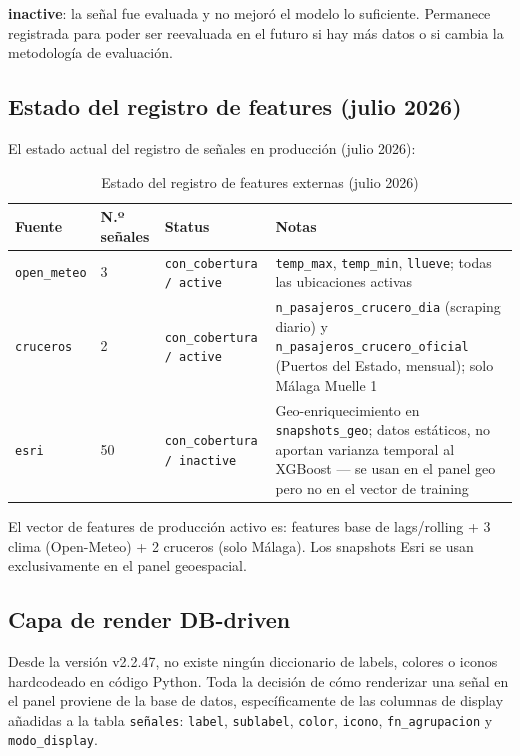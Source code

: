 \documentclass[12pt, a4paper]{article}
\begin{document}
\textbf{inactive}: la señal fue evaluada y no mejoró el modelo lo suficiente. Permanece registrada para poder ser reevaluada en el futuro si hay más datos o si cambia la metodología de evaluación.

\subsection{Estado del registro de features (julio 2026)}

El estado actual del registro de señales en producción (julio 2026):

\begin{table}[H]
\centering
\renewcommand{\arraystretch}{1.3}
\begin{tabular}{lllp{5cm}}
\toprule
\textbf{Fuente} & \textbf{N.º señales} & \textbf{Status} & \textbf{Notas} \\
\midrule
\texttt{open\_meteo}  & 3 & \texttt{con\_cobertura / active} & \texttt{temp\_max}, \texttt{temp\_min}, \texttt{llueve}; todas las ubicaciones activas \\
\texttt{cruceros}     & 2 & \texttt{con\_cobertura / active} & \texttt{n\_pasajeros\_crucero\_dia} (scraping diario) y \texttt{n\_pasajeros\_crucero\_oficial} (Puertos del Estado, mensual); solo Málaga Muelle 1 \\
\texttt{esri}         & 50 & \texttt{con\_cobertura / inactive} & Geo-enriquecimiento en \texttt{snapshots\_geo}; datos estáticos, no aportan varianza temporal al XGBoost — se usan en el panel geo pero no en el vector de training \\
\bottomrule
\end{tabular}
\caption{Estado del registro de features externas (julio 2026)}
\end{table}

El vector de features de producción activo es: features base de lags/rolling + 3 clima (Open-Meteo) + 2 cruceros (solo Málaga). Los snapshots Esri se usan exclusivamente en el panel geoespacial.

\subsection{Capa de render DB-driven}

Desde la versión v2.2.47, no existe ningún diccionario de labels, colores o iconos hardcodeado en código Python. Toda la decisión de cómo renderizar una señal en el panel proviene de la base de datos, específicamente de las columnas de display añadidas a la tabla \texttt{señales}: \texttt{label}, \texttt{sublabel}, \texttt{color}, \texttt{icono}, \texttt{fn\_agrupacion} y \texttt{modo\_display}.
\end{document}
